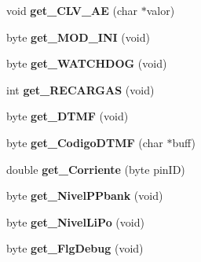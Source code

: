 \begin{DoxyCompactItemize}
\item 
void {\bfseries get\+\_\+\+C\+L\+V\+\_\+\+AE} (char $\ast$valor)\hypertarget{class_u_f___s_y_s_a81f582a2257a8966dc71aa84f3d0c062}{}\label{class_u_f___s_y_s_a81f582a2257a8966dc71aa84f3d0c062}

\item 
byte {\bfseries get\+\_\+\+M\+O\+D\+\_\+\+I\+NI} (void)\hypertarget{class_u_f___s_y_s_a2a0e3288708d3a5f4ef989c947787004}{}\label{class_u_f___s_y_s_a2a0e3288708d3a5f4ef989c947787004}

\item 
byte {\bfseries get\+\_\+\+W\+A\+T\+C\+H\+D\+OG} (void)\hypertarget{class_u_f___s_y_s_a3657330bc7f33ddc21bc65408998d964}{}\label{class_u_f___s_y_s_a3657330bc7f33ddc21bc65408998d964}

\item 
int {\bfseries get\+\_\+\+R\+E\+C\+A\+R\+G\+AS} (void)\hypertarget{class_u_f___s_y_s_aa9ef6795a66aa01ae8f5c451a3152ee3}{}\label{class_u_f___s_y_s_aa9ef6795a66aa01ae8f5c451a3152ee3}

\item 
byte {\bfseries get\+\_\+\+D\+T\+MF} (void)\hypertarget{class_u_f___s_y_s_a85140c156509199643ef083ceeecc978}{}\label{class_u_f___s_y_s_a85140c156509199643ef083ceeecc978}

\item 
byte {\bfseries get\+\_\+\+Codigo\+D\+T\+MF} (char $\ast$buff)\hypertarget{class_u_f___s_y_s_a8f793053dbfde6b2b961854319893670}{}\label{class_u_f___s_y_s_a8f793053dbfde6b2b961854319893670}

\item 
double {\bfseries get\+\_\+\+Corriente} (byte pin\+ID)\hypertarget{class_u_f___s_y_s_a467f0f7bf031a22bca60b89ba27706e8}{}\label{class_u_f___s_y_s_a467f0f7bf031a22bca60b89ba27706e8}

\item 
byte {\bfseries get\+\_\+\+Nivel\+P\+Pbank} (void)\hypertarget{class_u_f___s_y_s_a6669e2811dedeff71a88f7558dfde48a}{}\label{class_u_f___s_y_s_a6669e2811dedeff71a88f7558dfde48a}

\item 
byte {\bfseries get\+\_\+\+Nivel\+Li\+Po} (void)\hypertarget{class_u_f___s_y_s_a4bf464c05a15b0f38f974a191d46f4f2}{}\label{class_u_f___s_y_s_a4bf464c05a15b0f38f974a191d46f4f2}

\item 
byte {\bfseries get\+\_\+\+Flg\+Debug} (void)\hypertarget{class_u_f___s_y_s_a766e1a03bc3b96eb899ef077d0185f92}{}\label{class_u_f___s_y_s_a766e1a03bc3b96eb899ef077d0185f92}


\end{DoxyCompactItemize}
